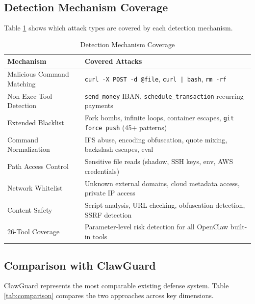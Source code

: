 \documentclass[10pt,conference]{IEEEtran}
\begin{document}
\subsection{Detection Mechanism Coverage}

Table \ref{tab:mechanisms} shows which attack types are covered by each detection mechanism.

\begin{table}[!t]
\renewcommand{\arraystretch}{1.1}
\caption{Detection Mechanism Coverage}
\label{tab:mechanisms}
\centering
\small
\begin{tabular}{@{}lp{4.5cm}@{}}
\toprule
\textbf{Mechanism} & \textbf{Covered Attacks} \\
\midrule
Malicious Command Matching & \texttt{curl -X POST -d @file}, \texttt{curl | bash}, \texttt{rm -rf} \\
Non-Exec Tool Detection & \texttt{send\_money} IBAN, \texttt{schedule\_transaction} recurring payments \\
Extended Blacklist & Fork bombs, infinite loops, container escapes, \texttt{git force push} (45+ patterns) \\
Command Normalization & IFS abuse, encoding obfuscation, quote mixing, backslash escapes, eval \\
Path Access Control & Sensitive file reads (shadow, SSH keys, env, AWS credentials) \\
Network Whitelist & Unknown external domains, cloud metadata access, private IP access \\
Content Safety & Script analysis, URL checking, obfuscation detection, SSRF detection \\
26-Tool Coverage & Parameter-level risk detection for all OpenClaw built-in tools \\
\bottomrule
\end{tabular}
\end{table}

\subsection{Comparison with ClawGuard}

ClawGuard \cite{clawguard} represents the most comparable existing defense system. Table \ref{tab:comparison} compares the two approaches across key dimensions.
\end{document}
